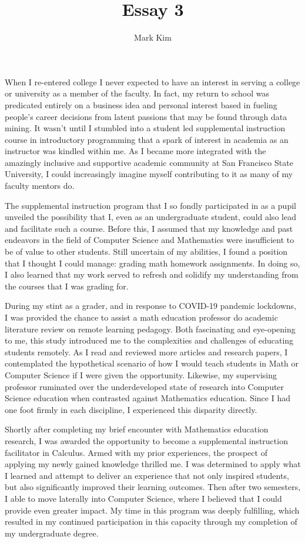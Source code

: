\documentclass[12pt]{article}
\title{Essay 3}
\author{Mark Kim}
\begin{document}
\maketitle

When I re-entered college I never expected to have an interest in serving a
college or university as a member of the faculty.  In fact, my return to school was
predicated entirely on a business idea and personal interest based in fueling
people's career decisions from latent passions that may be found through data
mining.  It wasn't until I stumbled into a student led supplemental instruction
course in introductory programming that a spark of interest in academia as an
instructor was kindled within me.  As I became more integrated with the
amazingly inclusive and supportive academic community at San Francisco State
University, I could increasingly imagine myself contributing to it as many of my
faculty mentors do.

The supplemental instruction program that I so fondly participated in as a
pupil unveiled the possibility that I, even as an undergraduate student, could
also lead and facilitate such a course.  Before this, I assumed that my
knowledge and past endeavors in the field of Computer Science and Mathematics were
insufficient to be of value to other students.  Still uncertain of my abilities,
I found a position that I thought I could manage: grading math homework
assignments.  In doing so, I also learned that my work served to refresh and
solidify my understanding from the courses that I was grading for.

During my stint as a grader, and in response to COVID-19 pandemic lockdowns, I
was provided the chance to assist a math education professor do academic
literature review on remote learning pedagogy.  Both fascinating and eye-opening
to me, this study introduced me to the complexities and challenges of
educating students remotely.  As I read and reviewed more articles and research
papers, I contemplated the hypothetical scenario of how I would teach students
in Math or Computer Science if I were given the opportunity.  Likewise, my
supervising professor ruminated over the underdeveloped state of research into
Computer Science education when contrasted against Mathematics education.  Since
I had one foot firmly in each discipline, I experienced this disparity directly.

Shortly after completing my brief encounter with Mathematics education research,
I was awarded the opportunity to become a supplemental instruction facilitator
in Calculus.  Armed with my prior experiences, the prospect of applying my newly
gained knowledge thrilled me.  I was determined to apply what I learned and attempt to
deliver an experience that not only inspired students, but also significantly
improved their learning outcomes.  Then after two semesters, I able to move
laterally into Computer Science, where I believed that I could provide even greater
impact.  My time in this program was deeply fulfilling, which
resulted in my continued participation in this capacity through my completion of
my undergraduate degree.
\end{document}
